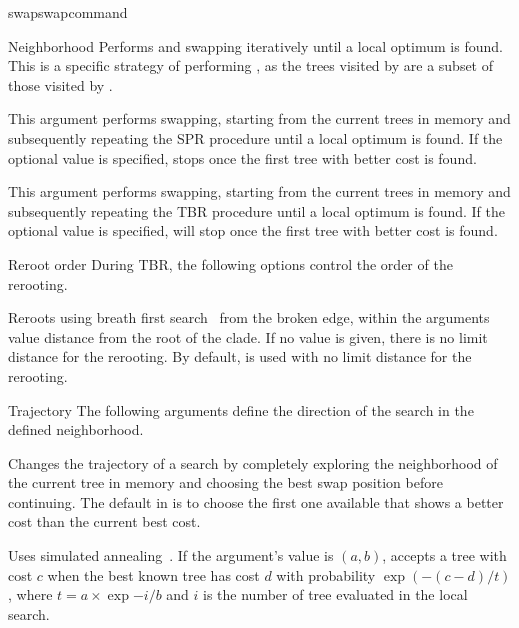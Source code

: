 \begin{command}{swap}{swapcommand}
\begin{arguments}
\begin{argumentgroup}{Neighborhood}
{Performs  and 
swapping iteratively until a local optimum is found.
This is a specific strategy of performing ,
as the trees visited by  are a subset
of those visited by .}
{}

{This argument performs  swapping, starting
from the current trees in memory and subsequently repeating
the SPR procedure until a local optimum is found. If the optional value
 is specified,  
stops once the first tree with better cost is found.} 
{}

{This argument performs  swapping, starting
from the current trees in memory and subsequently repeating
the TBR procedure until a local optimum is found. If the optional value
 is specified,  
will stop once the first tree with better cost is found.}
{}

\end{argumentgroup}

\begin{argumentgroup}{Reroot order}
{During TBR, the following options control the order of the rerooting.}

{Reroots using breath first search~\cite{cormen2001} from the broken edge, within the
arguments value distance from the root of the clade. If no value is
given, there is no limit distance for the rerooting. By default, 
is used with no limit distance for the rerooting.}
{}

\end{argumentgroup}

\begin{argumentgroup}{Trajectory}
{The following arguments define the direction of the search in the defined
neighborhood.}

{Changes the trajectory of a search by
completely exploring the neighborhood of the current
tree in memory and choosing the best swap position
before continuing.
The default in \poy is to choose the first one
available that shows a better cost than the current
best cost.}
{}

{Uses simulated annealing~\cite{Kirkpatrick1983}. If the argument's value is $(a, b)$, 
\poy accepts a tree with cost $c$ when the best known tree has
cost $d$ with probability $\exp{(- (c - d) / t)}$, where
$t = a \times \exp{- i / b}$ and $i$ is the number of tree
evaluated in the local search.}
{}


\end{argumentgroup}
\end{arguments}
\end{command}

